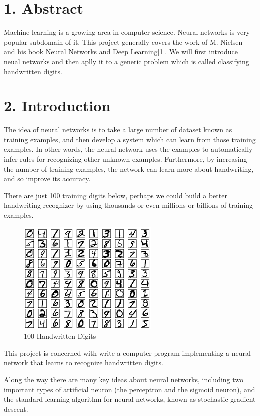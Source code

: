 \documentclass[12 pt]{article}
\begin{document}
\section{1. Abstract}\label{abstract}

Machine learning is a growing area in computer science. Neural networks
is very popular subdomain of it. This project generally covers the work
of M. Nielsen and his book Neural Networks and Deep Learning{[}1{]}. We
will first introduce neual networks and then aplly it to a generic
problem which is called classifying handwritten digits.

\section{2. Introduction}\label{introduction}

The idea of neural networks is to take a large number of dataset known
as training examples, and then develop a system which can learn from
those training examples. In other words, the neural network uses the
examples to automatically infer rules for recognizing other unknown
examples. Furthermore, by increasing the number of training examples,
the network can learn more about handwriting, and so improve its
accuracy.

There are just 100 training digits below, perhaps we could build a
better handwriting recognizer by using thousands or even millions or
billions of training examples.

\begin{figure}[htp]
\centering
\includegraphics{./figs/mnist_100_digits.png}
\caption{100 Handwritten Digits}
\end{figure}

This project is concerned with write a computer program implementing a
neural network that learns to recognize handwritten digits.

Along the way there are many key ideas about neural networks, including
two important types of artificial neuron (the perceptron and the sigmoid
neuron), and the standard learning algorithm for neural networks, known
as stochastic gradient descent.
\end{document}
